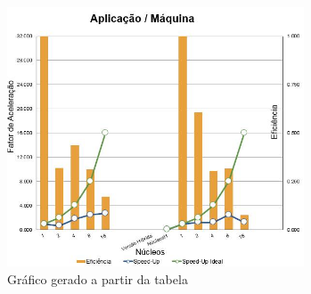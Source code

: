 \documentclass[11pt]{IEEEtran}
\begin{document}

	\begin{figure}[H]
		\centering
		\includegraphics[width=88mm]{graph.png}
		\caption{Gráfico gerado a partir da tabela}
		\label{fig_graph}
	\end{figure}
\end{document}

